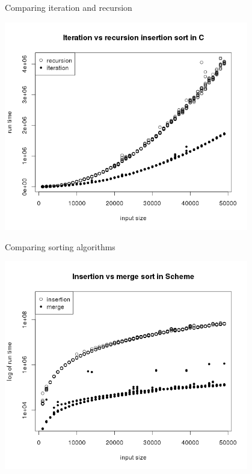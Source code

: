 \documentclass[]{beamer}
\begin{document}
\begin{frame}[t]{Comparing iteration and recursion}
\begin{center}
	\includegraphics[width=0.8\textwidth]{plots/i_vs_r_insertion_in_c.png}
\end{center}
\end{frame}

\begin{frame}[t]{Comparing sorting algorithms}
\begin{center}
	\includegraphics[width=0.8\textwidth]{plots/insertion_vs_merge_in_scheme.png}
\end{center}
\end{frame}
\end{document}
